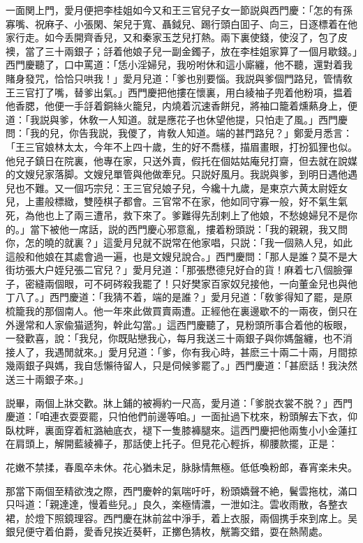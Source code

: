 一面関上門，愛月便把李桂姐如今又和王三官兒子女一節説與西門慶：「怎的有孫寡嘴、祝麻子、小張閑、架兒于寬、聶鉞兒、踢行頭白囬子、向三，日逐標着在他家行走。如今丢開齊香兒，又和秦家玉芝兒打熱。兩下裏使錢，使沒了，包了皮襖，當了三十兩銀子；㧱着他娘子兒一副金鐲子，放在李桂姐家算了一個月歇錢。」西門慶聽了，口中罵道：「恁小淫婦兒，我吩咐休和這小廝纏，他不聽，還對着我賭身發咒，恰恰只哄我！」愛月兒道：「爹也别要惱。我説與爹個門路兒，管情敎王三官打了嘴，替爹出氣。」西門慶把他摟在懷裏，用白綾袖子兜着他粉項，揾着他香腮，他便一手㧱着銅絲火籠兒，内燒着沉速香餅兒，將袖口籠着燻爇身上，便道：「我説與爹，休敎一人知道。就是應花子也休望他提，只怕走了風。」西門慶問：「我的兒，你告我説，我儍了，肯敎人知道。端的甚門路兒？」鄭愛月悉言：「王三官娘林太太，今年不上四十歲，生的好不喬樣，描眉畫眼，打扮狐狸也似。他兒子鎮日在院裏，他專在家，只送外賣，假托在個姑姑庵兒打齋，但去就在說媒的文嫂兒家落脚。文嫂兒單管與他做牽兒。只説好風月。我説與爹，到明日遇他遇兒也不難。又一個巧宗兒：王三官兒娘子兒，今纔十九歲，是東京六黄太尉姪女兒，上畫般標緻，雙陸棋子都會。三官常不在家，他如同守寡一般，好不氣生氣死，為他也上了兩三遭吊，救下來了。爹難得先刮剌上了他娘，不愁媳婦兒不是你的。」當下被他一席話，説的西門慶心邪意亂，摟着粉頭説：「我的親親，我又問你，怎的曉的就裏？」這愛月兒就不説常在他家唱，只説：「我一個熟人兒，如此這般和他娘在其處會過一遍，也是文嫂兒說合。」西門慶問：「那人是誰？莫不是大街坊張大户姪兒張二官兒？」愛月兒道：「那張懋德兒好㒲的貨！麻着七八個臉彈子，密縫兩個眼，可不砢硶殺我罷了！只好樊家百家奴兒接他，一向董金兒也與他丁八了。」西門慶道：「我猜不着，端的是誰？」愛月兒道：「敎爹得知了罷，是原梳籠我的那個南人。他一年來此做買賣兩遭。正經他在裏邊歇不的一兩夜，倒只在外邊常和人家偸猫遞狗，幹此勾當。」這西門慶聽了，見粉頭所事合着他的板眼，一發歡喜，說：「我兒，你既貼戀我心，每月我送三十兩銀子與你媽盤纏，也不消接人了，我遇閒就來。」愛月兒道：「爹，你有我心時，甚麽三十兩二十兩，月間掠幾兩銀子與媽，我自恁懶待留人，只是伺候爹罷了。」西門慶道：「甚麽話！我決然送三十兩銀子來。」

説畢，兩個上牀交歡。牀上鋪的被褥約一尺高，愛月道：「爹脱衣裳不脱？」西門慶道：「咱連衣耍耍罷，只怕他們前邊等咱。」一面扯過下枕來，粉頭解去下衣，仰臥枕畔，裏面穿着紅潞紬底衣，褪下一隻膝褲腿來。這西門慶把他兩隻小小金蓮扛在肩頭上，解開藍綾褲子，那話使上托子。但見花心輕拆，柳腰款擺，正是：

花嫩不禁揉，春風卒未休。花心猶未足，脉脉情無極。低低喚粉郎，春宵楽未央。

那當下兩個至精欲洩之際，西門慶幹的氣喘吁吁，粉頭嬌聲不絶，鬢雲拖枕，滿口只呌道：「親達達，慢着些兒。」良久，楽極情濃，一泄如注。雲收雨散，各整衣裙，於燈下照鏡理容。西門慶在牀前盆中淨手，着上衣服，兩個携手來到席上。吴銀兒便守着伯爵，愛香兒挨近葵軒，正擲色猜枚，觥籌交錯，耍在熱鬧處。

